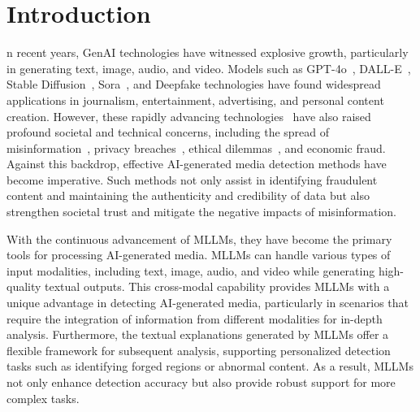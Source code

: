 \section{Introduction}
\label{sec:intro}

n recent years, GenAI technologies have witnessed explosive growth, particularly in generating text, image, audio, and video. Models such as GPT-4o~\cite{openai2024}, DALL-E~\cite{betker2023improving}, Stable Diffusion~\cite{rombach2022high}, Sora~\cite{brooks2024video}, and Deepfake technologies have found widespread applications in journalism, entertainment, advertising, and personal content creation. However, these rapidly advancing technologies~\cite{li2023pluralistic, li2019global, cui2024localize} have also raised profound societal and technical concerns, including the spread of misinformation~\cite{xu2023combating, ma2024deep}, privacy breaches~\cite{jenks2024communicating}, ethical dilemmas~\cite{samuelson2023generative,liu2024jailbreak}, and economic fraud. Against this backdrop, effective AI-generated media detection methods have become imperative. Such methods not only assist in identifying fraudulent content and maintaining the authenticity and credibility of data but also strengthen societal trust and mitigate the negative impacts of misinformation.


With the continuous advancement of MLLMs, they have become the primary tools for processing AI-generated media. MLLMs can handle various types of input modalities, including text, image, audio, and video while generating high-quality textual outputs. This cross-modal capability provides MLLMs with a unique advantage in detecting AI-generated media, particularly in scenarios that require the integration of information from different modalities for in-depth analysis. Furthermore, the textual explanations generated by MLLMs offer a flexible framework for subsequent analysis, supporting personalized detection tasks such as identifying forged regions or abnormal content. As a result, MLLMs not only enhance detection accuracy but also provide robust support for more complex tasks.

